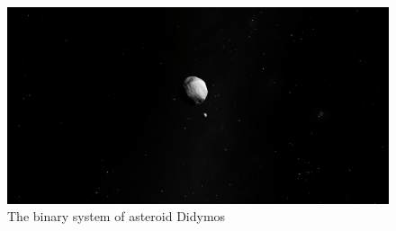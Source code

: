 \begin{figure}[b]
    \includegraphics[width=\linewidth]{rsc/didy.png}
    \caption{The binary system of asteroid Didymos}
    \label{fig:1.2}
\end{figure}
